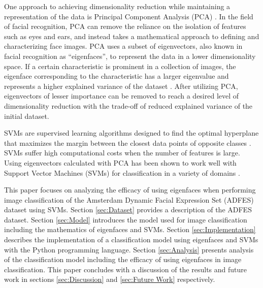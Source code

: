 \documentclass[journal]{new-aiaa}
\begin{document}
One approach to achieving dimensionality reduction while maintaining a representation of the data is Principal Component Analysis (PCA) \cite{abdi2010principal}.
In the field of facial recognition, PCA can remove the reliance on the isolation of features such as eyes and ears, and instead takes a mathematical approach to defining and characterizing face images. 
PCA uses a subset of eigenvectors, also known in facial recognition as ``eigenfaces'', to represent the data in a lower dimensionality space.
If a certain characteristic is prominent in a collection of images, the eigenface corresponding to the characteristic has a larger eigenvalue and represents a higher explained variance of the dataset \cite{turk1991face}. 
After utilizing PCA, eigenvectors of lesser importance can be removed to reach a desired level of dimensionality reduction with the trade-off of reduced explained variance of the initial dataset.

SVMs are supervised learning algorithms designed to find the optimal hyperplane that maximizes the margin between the closest data points of opposite classes \cite{708428}.
SVMs suffer high computational costs when the number of features is large.
Using eigenvectors calculated with PCA has been shown to work well with Support Vector Machines (SVMs) for classification in a variety of domains \cite{mangasarian2005multisurface}\cite{alvarez2009alzheimer}\cite{melivsek2008support}.

This paper focuses on analyzing the efficacy of using eigenfaces when performing image classification of the Amsterdam Dynamic Facial Expression Set (ADFES) dataset using SVMs.
Section \ref{sec:Dataset} provides a description of the ADFES dataset.
Section \ref{sec:Model} introduces the model used for image classification including the mathematics of eigenfaces and SVMs.
Section \ref{sec:Implementation} describes the implementation of a classification model using eigenfaces and SVMs with the Python programming language.
Section \ref{sec:Analysis} presents analysis of the classification model including the efficacy of using eigenfaces in image classification.
This paper concludes with a discussion of the results and future work in sections \ref{sec:Discussion} and \ref{sec:Future Work} respectively.
\end{document}
